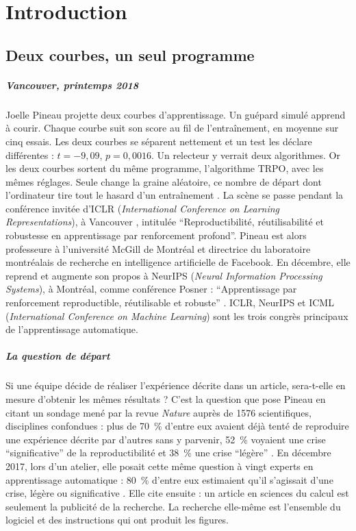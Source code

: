 \chapter{Introduction}\label{chap:01-introduction}

\section{Deux courbes, un seul programme}\label{sec:intro-conferences}

\paragraph{Vancouver, printemps 2018}
Joelle Pineau projette deux courbes d'apprentissage. Un guépard simulé apprend à courir. Chaque courbe
suit son score au fil de l'entraînement, en moyenne sur cinq essais. Les deux courbes se séparent
nettement et un test les déclare différentes : $t = -9{,}09$, $p = 0{,}0016$. Un relecteur y verrait
deux algorithmes. Or les deux courbes sortent du même programme, l'algorithme TRPO, avec les mêmes
réglages. Seule change la graine aléatoire, ce nombre de départ dont l'ordinateur tire tout le hasard
d'un entraînement \parencite{henderson2018matters}. La scène se passe pendant la conférence invitée
d'ICLR (\emph{International Conference on Learning Representations}), à Vancouver
\parencite{pineau2018iclr}, intitulée \enquote{Reproductibilité, réutilisabilité et robustesse en
apprentissage par renforcement profond}. Pineau est alors professeure à l'université McGill de
Montréal et directrice du laboratoire montréalais de recherche en intelligence artificielle de
Facebook. En décembre, elle reprend et augmente son propos à NeurIPS (\emph{Neural Information
Processing Systems}), à Montréal, comme conférence Posner : \enquote{Apprentissage par renforcement
reproductible, réutilisable et robuste} \parencite{pineau2018neurips}. ICLR, NeurIPS et ICML
(\emph{International Conference on Machine Learning}) sont les trois congrès principaux de
l'apprentissage automatique.

\paragraph{La question de départ}
Si une équipe décide de réaliser l'expérience décrite dans un article, sera-t-elle en mesure d'obtenir les
mêmes résultats ? C'est la question que pose Pineau en citant un sondage mené par la revue \emph{Nature}
auprès de \num{1576} scientifiques, disciplines confondues : plus de 70~\% d'entre eux avaient déjà tenté de
reproduire une expérience décrite par d'autres sans y parvenir, 52~\% voyaient une crise
\enquote{significative} de la reproductibilité et 38~\% une crise
\enquote{légère} \parencite{baker2016reproducibility}. En décembre 2017, lors d'un atelier, elle posait
cette même question à vingt experts en apprentissage automatique : 80~\% d'entre eux estimaient qu'il
s'agissait d'une crise, légère ou significative \parencite{pineau2018iclr}. Elle cite ensuite
\textcite{buckheit1995wavelab} : un article en sciences du calcul est seulement la publicité de la
recherche. La recherche elle-même est l'ensemble du logiciel et des instructions qui ont produit les
figures.

